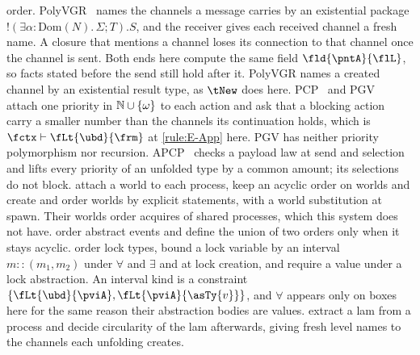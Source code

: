 order.
PolyVGR~\cite{SaffrichT23} names the channels a message carries by an
existential package $!(\exists \alpha{:}\mathrm{Dom}(N).\, \Sigma; T).S$,
and the receiver gives each received channel a fresh name. A closure
that mentions a channel loses its connection to that channel once the
channel is sent. Both ends here compute the same field
$\fld{\pntA}{\flL}$, so facts stated before the send still hold after it.
PolyVGR names a created channel by an existential result type, as
$\tNew$ does here.
PCP~\cite{DardhaG18} and PGV~\cite{KokkeD23} attach one priority in
$\mathbb{N} \cup {\{\omega\}}$ to each action and ask that a blocking action
carry a smaller number than the channels its continuation holds, which
is $\fctx \types \fLt{\ubd}{\frm}$ at \ref{rule:E-App} here. PGV has
neither priority polymorphism nor recursion.
APCP~\cite{APCP} checks a payload law at send and selection and lifts
every priority of an unfolded type by a common amount; its selections do
not block.
\citet{BalzerTP19} attach a world to each process, keep an acyclic order
on worlds and create and order worlds by explicit statements, with a
world substitution at spawn. Their worlds order acquires of shared
processes, which this system does not have.
\citet{VieiraV13} order abstract events and define the union of two
orders only when it stays acyclic.
\citet{FlanaganA99} order lock types, bound a lock variable by an
interval $m :: (m_1, m_2)$ under $\forall$ and $\exists$ and at
lock creation, and require a value under a lock abstraction. An interval
kind is a constraint $\set{\fLt{\ubd}{\pviA}, \fLt{\pviA}{\asTy{v}}}$,
and $\forall$ appears only on boxes here for the same reason their
abstraction bodies are values.
\citet{KobayashiL17} extract a lam from a process and decide
circularity of the lam afterwards, giving fresh level names to the
channels each unfolding creates.

